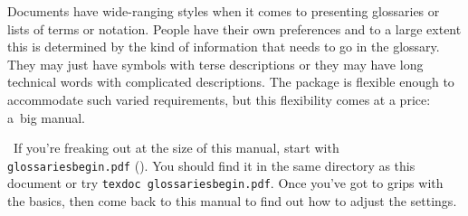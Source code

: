 \documentclass[report,inlinetitle,widecs]{nlctdoc}
\begin{document}
\begin{important}
Documents have wide-ranging styles when it comes to presenting glossaries
or lists of terms or notation. People have their own preferences and
to a large extent this is determined by the kind of information that
needs to go in the glossary. They may just have symbols with
terse descriptions or they may have long technical words with
complicated descriptions. The  package is
flexible enough to accommodate such varied requirements, but this
flexibility comes at a price: a~big manual.

\aargh\ If you're freaking out at the size of this manual, start with
\texttt{glossariesbegin.pdf} (). You should find it in the same directory as this
document or try \texttt{texdoc glossariesbegin.pdf}. Once you've got
to grips with the basics, then come back to this manual to find out
how to adjust the settings.
\end{important}
\end{document}
